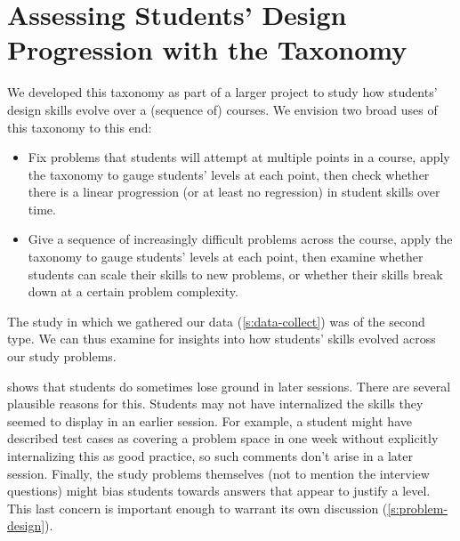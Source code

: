 

\section{Assessing Students' Design Progression with the Taxonomy}

We developed this taxonomy as part of a larger project to study how
students' design skills evolve over a (sequence of) courses.  We
envision two broad uses of this taxonomy to this end:

\begin{itemize}
\item Fix problems that students will attempt at multiple
  points in a course, apply the taxonomy to gauge students' levels at
  each point, then check whether there is a linear progression (or at
  least no regression) in student skills over time.

\item Give a sequence of increasingly difficult problems across the
  course, apply the
  taxonomy to gauge students' levels at each point, then examine
  whether students can scale their skills to new problems, or whether
  their skills break down at a certain problem complexity.

\end{itemize}

\noindent
The study in which we gathered our data (\cref{s:data-collect}) was of the second
type.  We can thus examine  for insights
into how students' skills evolved across our study problems.

 shows that students do sometimes lose
ground in later sessions.  There are several plausible reasons for
this.  Students may not have internalized the skills they seemed to display
in an earlier session. For example, a student might have described
test cases as covering a problem space in one week without explicitly
internalizing this as good practice, so such comments don't arise in a
later session.
Finally, the study problems themselves (not to mention
the interview questions) might bias students towards answers that
appear to justify a level.  This last concern is important enough to
warrant its own discussion (\cref{s:problem-design}).

